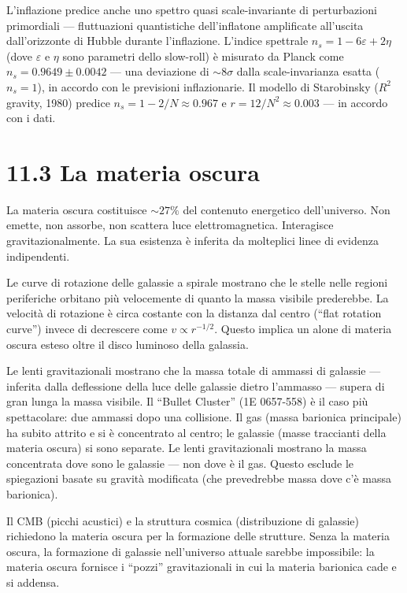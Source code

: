 \documentclass[11.5pt,a4paper,openany]{book}
\theoremstyle{remark}
\begin{document}
L'inflazione predice anche uno spettro quasi scale-invariante di perturbazioni primordiali --- fluttuazioni quantistiche dell'inflatone amplificate all'uscita dall'orizzonte di Hubble durante l'inflazione. L'indice spettrale $n_s = 1 - 6\varepsilon + 2\eta$ (dove $\varepsilon$ e $\eta$ sono parametri dello slow-roll) è misurato da Planck come $n_s = 0.9649 \pm 0.0042$ --- una deviazione di $\sim 8\sigma$ dalla scale-invarianza esatta ($n_s = 1$), in accordo con le previsioni inflazionarie. Il modello di Starobinsky ($R^2$ gravity, 1980) predice $n_s = 1 - 2/N \approx 0.967$ e $r = 12/N^2 \approx 0.003$ --- in accordo con i dati.

\section{11.3 La materia oscura}

La materia oscura costituisce $\sim 27\%$ del contenuto energetico dell'universo. Non emette, non assorbe, non scattera luce elettromagnetica. Interagisce gravitazionalmente. La sua esistenza è inferita da molteplici linee di evidenza indipendenti.

Le curve di rotazione delle galassie a spirale mostrano che le stelle nelle regioni periferiche orbitano più velocemente di quanto la massa visibile prederebbe. La velocità di rotazione è circa costante con la distanza dal centro (``flat rotation curve'') invece di decrescere come $v \propto r^{-1/2}$. Questo implica un alone di materia oscura esteso oltre il disco luminoso della galassia.

Le lenti gravitazionali mostrano che la massa totale di ammassi di galassie --- inferita dalla deflessione della luce delle galassie dietro l'ammasso --- supera di gran lunga la massa visibile. Il ``Bullet Cluster'' (1E 0657-558) è il caso più spettacolare: due ammassi dopo una collisione. Il gas (massa barionica principale) ha subito attrito e si è concentrato al centro; le galassie (masse traccianti della materia oscura) si sono separate. Le lenti gravitazionali mostrano la massa concentrata dove sono le galassie --- non dove è il gas. Questo esclude le spiegazioni basate su gravità modificata (che prevedrebbe massa dove c'è massa barionica).

Il CMB (picchi acustici) e la struttura cosmica (distribuzione di galassie) richiedono la materia oscura per la formazione delle strutture. Senza la materia oscura, la formazione di galassie nell'universo attuale sarebbe impossibile: la materia oscura fornisce i ``pozzi'' gravitazionali in cui la materia barionica cade e si addensa.
\end{document}
